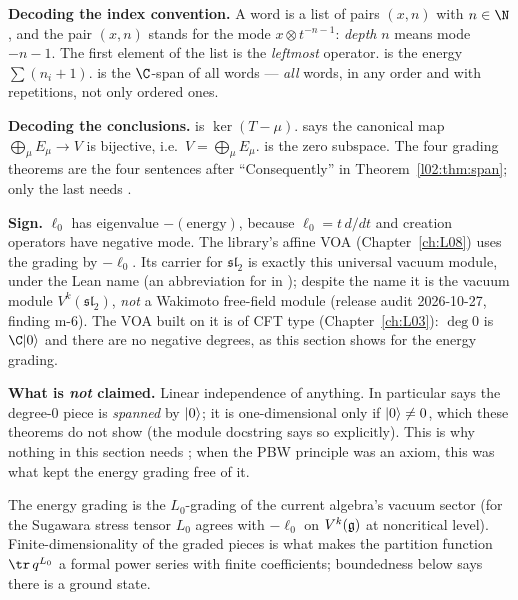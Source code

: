 \begin{dictionary}
\textbf{Decoding the index convention.} A word is a list of pairs $(x,n)$ with $n\in\N$, and the
pair $(x,n)$ stands for the mode $x\otimes t^{-n-1}$: \emph{depth} $n$ means mode $-n-1$. The first
element of the list is the \emph{leftmost} operator.  is the energy
$\sum(n_i+1)$.  is the $\C$-span of all words --- \emph{all} words, in any order and with
repetitions, not only ordered ones.

\textbf{Decoding the conclusions.}  is $\ker(T-\mu)$.
 says the canonical map $\bigoplus_\mu E_\mu\to V$ is
bijective, i.e.\ $V = \bigoplus_\mu E_\mu$.  is the zero subspace. The four grading
theorems are the four sentences after ``Consequently'' in Theorem~\ref{l02:thm:span}; only the last
needs \lean{[FiniteDimensional ℂ 𝔤]}.

\textbf{Sign.} $\ell_0$ has eigenvalue $-(\text{energy})$, because $\ell_0 = t\,d/dt$ and creation
operators have negative mode. The library's affine VOA (Chapter~\ref{ch:L08}) uses the grading by
$-\ell_0$. Its carrier for $\mathfrak{sl}_2$ is exactly this universal vacuum module, under the Lean name
 (an abbreviation for  in ); despite the name it is the vacuum module
$V^k(\mathfrak{sl}_2)$, \emph{not} a Wakimoto free-field module (release audit 2026-10-27, finding m-6). The VOA built on it is
of CFT type (Chapter~\ref{ch:L03}): $\deg 0$ is $\C\ltwovac$ and there are no negative degrees, as this section shows for
the energy grading.

\textbf{What is \emph{not} claimed.} Linear independence of anything. In particular
\allowbreak{} says the degree-$0$ piece is \emph{spanned} by $|0\rangle$; it is
one-dimensional only if $|0\rangle\ne0$, which these theorems do not show (the module docstring says so
explicitly). This is why nothing in this section needs ; when the PBW principle was
an axiom, this was what kept the energy grading free of it.
\end{dictionary}

\begin{physics}
The energy grading is the $L_0$-grading of the current algebra's vacuum sector (for the Sugawara
stress tensor $L_0$ agrees with $-\ell_0$ on $V^k(\mathfrak{g})$ at noncritical level). Finite-dimensionality
of the graded pieces is what makes the partition function $\tr\,q^{L_0}$ a formal power series with
finite coefficients; boundedness below says there is a ground state.
\end{physics}

